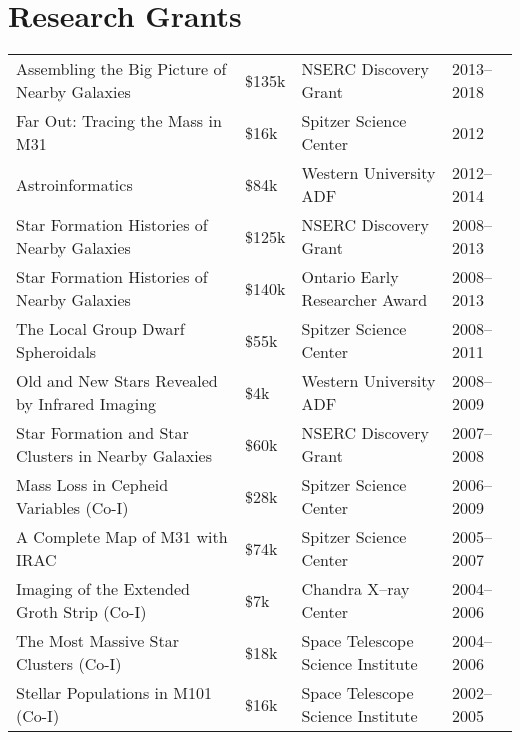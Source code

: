 \documentclass[12pt]{article}
\begin{document}

\section{Research Grants}

\begin{tabular}{p{9cm}lp{5cm}l}

Assembling the Big Picture of Nearby Galaxies & \$135k & NSERC Discovery Grant & 2013--2018 \\ 

Far Out: Tracing the Mass in M31& \$16k& Spitzer Science Center & 2012\\ 

Astroinformatics & \$84k& Western University ADF& 2012--2014\\ 

 Star Formation Histories of Nearby Galaxies & \$125k& NSERC Discovery Grant & 2008--2013\\ 

Star Formation Histories of Nearby Galaxies & \$140k& Ontario Early Researcher Award& 2008--2013\\ 

 The Local Group Dwarf Spheroidals & \$55k& Spitzer Science Center & 2008--2011\\ 

Old and New Stars Revealed by Infrared Imaging & \$4k& Western University ADF  & 2008--2009\\

Star Formation and Star Clusters in Nearby Galaxies & \$60k& NSERC Discovery Grant&2007--2008\\  %

Mass Loss in Cepheid Variables (Co-I)& \$28k& Spitzer Science Center & 2006--2009\\ 

 A Complete Map of M31 with IRAC & \$74k& Spitzer Science Center & 2005--2007\\

Imaging of the Extended Groth Strip (Co-I)& \$7k& Chandra X--ray Center& 2004--2006\\ 

The Most Massive Star Clusters (Co-I)& \$18k & Space Telescope Science Institute& 2004--2006\\ 

Stellar Populations in M101 (Co-I)& \$16k & Space Telescope Science Institute& 2002--2005\\ 
\end{tabular}
\end{document}
